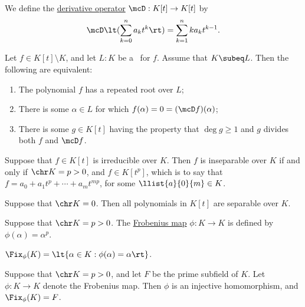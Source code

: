 \documentclass{article}
\begin{document}
  \begin{tdefinition}
    We define the \ul{derivative operator} \( \mcD:K[t]\to K[t] \) by \begin{align*}
      \mcD\lt(\sum_{k=0}^{n}a_kt^k\rt) = \sum_{k=1}^{n}ka_kt^{k-1}.
    \end{align*}
  \end{tdefinition}

  \begin{ttheorem}
    Let \( f\in K[t]\setminus K \), and let \( L:K \) be a \sfe~for \( f \).
    Assume that \( K\subeq L \).
    Then the following are equivalent: \begin{enumerate}[label=(\roman*)]
      \item The polynomial \( f \) has a repeated root over \( L \);
      \item There is some \( \alpha\in L \) for which \( f(\alpha)=0=(\mcD f)(\alpha) \);
      \item There is some \( g\in K[t] \) having the property that \( \deg g \geq 1 \) and \( g \) divides both \( f \) and \( \mcD f \).
    \end{enumerate}
  \end{ttheorem}

  \begin{ttheorem}
    Suppose that \( f\in K[t] \) is irreducible over \( K \).
    Then \( f \) is inseparable over \( K \) if and only if \( \chr K=p>0 \), and \( f \in K[t^p] \), which is to say that \( f=a_0+a_1t^p+\cdots+a_mt^{mp} \), for some \( \llist{a}{0}{m}\in K \).
  \end{ttheorem}

  \begin{tcorollary}
    Suppose that \( \chr K = 0 \).
    Then all polynomials in \( K[t] \) are separable over \( K \).
  \end{tcorollary}

  \begin{tdefinition}
    Suppose that \( \chr K = p > 0 \).
    The \ul{Frobenius map} \( \phi:K\to K \) is defined by \( \phi(\alpha)=\alpha^p \).
  \end{tdefinition}

   \( \Fix_\phi(K)=\lt\{ \alpha\in K:\phi(\alpha)=\alpha \rt\} \).

  \begin{ttheorem}
    Suppose that \( \chr K = p>0 \), and let \( F \) be the prime subfield of \( K \).
    Let \( \phi:K\to K \) denote the Frobenius map.
    Then \( \phi \) is an injective homomorphism, and \( \Fix_\phi(K) = F \).
  \end{ttheorem}
\end{document}
